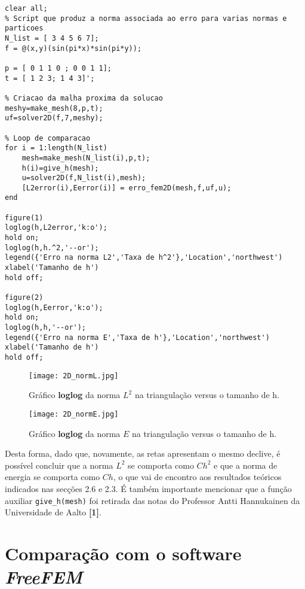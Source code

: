 \documentclass{article}
\theoremstyle{definition}
\theoremstyle{plain}
\numberwithin{equation}{section}
\newcommand{\tab}{\hspace{10mm}}
\begin{document}
\begin{lstlisting}[frame=single]
clear all;
% Script que produz a norma associada ao erro para varias normas e particoes
N_list = [ 3 4 5 6 7];
f = @(x,y)(sin(pi*x)*sin(pi*y));

p = [ 0 1 1 0 ; 0 0 1 1];
t = [ 1 2 3; 1 4 3]';

% Criacao da malha proxima da solucao
meshy=make_mesh(8,p,t);
uf=solver2D(f,7,meshy);

% Loop de comparacao
for i = 1:length(N_list)
    mesh=make_mesh(N_list(i),p,t);
    h(i)=give_h(mesh);
    u=solver2D(f,N_list(i),mesh);
    [L2error(i),Eerror(i)] = erro_fem2D(mesh,f,uf,u);
end

figure(1)
loglog(h,L2error,'k:o');
hold on;
loglog(h,h.^2,'--or');
legend({'Erro na norma L2','Taxa de h^2'},'Location','northwest')
xlabel('Tamanho de h')
hold off;

figure(2)
loglog(h,Eerror,'k:o');
hold on;
loglog(h,h,'--or');
legend({'Erro na norma E','Taxa de h'},'Location','northwest')
xlabel('Tamanho de h')
hold off;

\end{lstlisting}

\vspace{5mm}

\begin{figure}[H]
\centering
\texttt{[image: 2D\_normL.jpg]}
\caption{Gráfico \textbf{loglog} da norma $L^2$ na triangulação versus o tamanho de h. }
\end{figure}

\begin{figure}[H]
\centering
\texttt{[image: 2D\_normE.jpg]}
\caption{Gráfico \textbf{loglog} da norma $E$ na triangulação versus o tamanho de h. }
\end{figure}

\tab Desta forma, dado que, novamente, as retas apresentam o mesmo declive, é possível concluir que a norma $L^2$ se comporta como $Ch^2$ e que a norma de energia se comporta como $Ch$, o que vai de encontro aos resultados teóricos indicados nas secções 2.6 e 2.3. É também importante mencionar que a função auxiliar \verb +give_h(mesh)+ foi retirada das notas do Professor Antti
Hannukainen da Universidade de Aalto \textbf{[1]}.

\section{Comparação com o software \emph{FreeFEM}}
\end{document}
